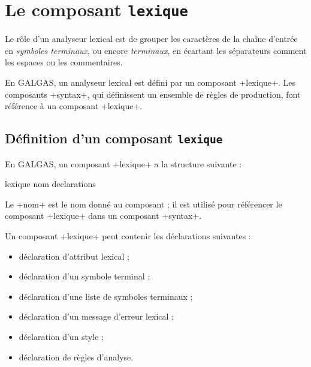 
\chapter{Le composant \texttt{lexique}}



Le rôle d'un analyseur lexical est de grouper les caractères de la chaîne d'entrée en \emph{symboles terminaux}, ou encore \emph{terminaux}, en écartant les séparateurs comment les espaces ou les commentaires.

En GALGAS, un analyseur lexical est défini par un composant \ggsq+lexique+. Les composants \ggsq+syntax+, qui définissent un ensemble de règles de production, font référence à un composant \ggsq+lexique+.









\section{Définition d'un composant \texttt{lexique}}


En GALGAS, un composant \ggsq+lexique+ a la structure suivante :

\begin{galgas4}
lexique nom {
  declarations
}
\end{galgas4}

Le \ggsq+nom+ est le nom donné au composant ; il est utilisé pour référencer le composant \ggsq+lexique+ dans un composant \ggsq+syntax+.


Un composant \ggsq+lexique+ peut contenir les déclarations suivantes :
\begin{itemize}
  \item déclaration d'attribut lexical ;
  \item déclaration d'un symbole terminal ;
  \item déclaration d'une liste de symboles terminaux ;
  \item déclaration d'un message d'erreur lexical ;
  \item déclaration d'un style ;
  \item déclaration de règles d'analyse.
\end{itemize}

